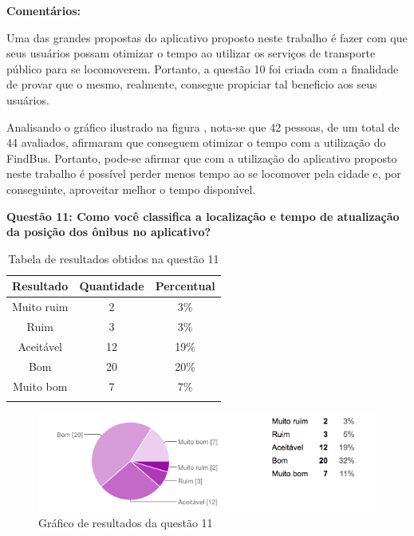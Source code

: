 \textbf{Comentários:}

Uma das grandes propostas do aplicativo proposto neste trabalho é fazer com que seus usuários possam otimizar o tempo ao utilizar os serviços de transporte público para se locomoverem. Portanto, a questão 10 foi criada com a finalidade de provar que o mesmo, realmente, consegue propiciar tal beneficio aos seus usuários. 
	
Analisando o gráfico ilustrado na figura , nota-se que 42 pessoas, de um total de 44 avaliados, afirmaram que conseguem otimizar o tempo com a utilização do FindBus. Portanto, pode-se afirmar que com a utilização do aplicativo proposto neste trabalho é possível perder menos tempo ao se locomover pela cidade e, por conseguinte, aproveitar melhor o tempo disponível.\newline

\textbf{Questão 11: Como você classifica a localização e tempo de atualização da posição dos ônibus no aplicativo?}

\begin{center}
\begin{longtable}{c|c|c}
\hline
    \multicolumn{1}{c}{\textbf{Resultado}} & \multicolumn{1}{c}{\textbf{Quantidade}} & \multicolumn{1}{c}{\textbf{Percentual}} \\
\hline
    Muito ruim & 2 &  3\%\\
    \hline
    Ruim & 3 & 3\%\\
    \hline
    Aceitável & 12 &  19\%\\
    \hline
    Bom & 20 & 20\%\\
    \hline
    Muito bom & 7 & 7\%\\
    \hline
\caption{Tabela de resultados obtidos na questão 11}
\label{tabq11}
\end{longtable}
\end{center}

\begin{figure}[!h]
\begin{center}
  \includegraphics[width=14cm]{images/graficos/questao11.png}
  \caption{Gráfico de resultados da questão 11}
  \label{fig:questao11}
\end{center}
\end{figure}

